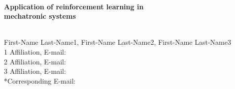 \documentclass[10pt,a4paper]{report}  %
\begin{document}
\begin{center}
\quad \\[1pt]
\fontsize{22pt}{3pt}\selectfont\hspace{0.35cm}\textbf{\sectionef Application of reinforcement learning in \\[12pt]
 mechatronic systems}\\[12pt]
\end{center}
\begin{center}
\qquad \\[27pt]
First-Name Last-Name1, First-Name Last-Name2, First-Name Last-Name3\\[12pt]
1 Affiliation, E-mail:\\[6pt]
2 Affiliation, E-mail:\\[6pt]
3 Affiliation, E-mail:\\[6pt]
*Corresponding E-mail: \\
\qquad \\
\end{center}
\fontsize{10pt}{13pt}\selectfont




\end{document}
